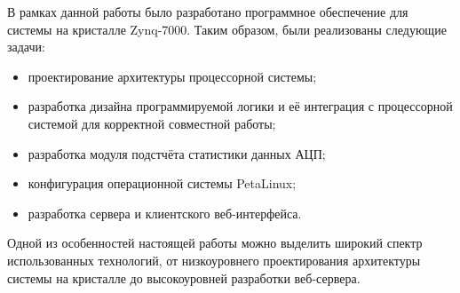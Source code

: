 В рамках данной работы было разработано программное обеспечение для системы на кристалле Zynq-7000. Таким образом, были реализованы следующие задачи:\par
\begin{itemize}
    \item проектирование архитектуры процессорной системы;
    \item разработка дизайна программируемой логики и её интеграция с процессорной системой для корректной совместной работы;
    \item разработка модуля подстчёта статистики данных АЦП;
    \item конфигурация операционной системы PetaLinux;
    \item разработка сервера и клиентского веб-интерфейса.
\end{itemize}\par
Одной из особенностей настоящей работы можно выделить широкий спектр использованных технологий, от низкоуровнего проектирования архитектуры системы на кристалле до высокоуровней разработки веб-сервера.
